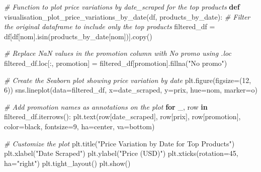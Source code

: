 \documentclass[
]{article}
\newenvironment{Shaded}{}{}
\newcommand{\CommentTok}[1]{\textcolor[rgb]{0.38,0.63,0.69}{\textit{#1}}}
\newcommand{\ControlFlowTok}[1]{\textcolor[rgb]{0.00,0.44,0.13}{\textbf{#1}}}
\newcommand{\DecValTok}[1]{\textcolor[rgb]{0.25,0.63,0.44}{#1}}
\newcommand{\KeywordTok}[1]{\textcolor[rgb]{0.00,0.44,0.13}{\textbf{#1}}}
\newcommand{\NormalTok}[1]{#1}
\newcommand{\OperatorTok}[1]{\textcolor[rgb]{0.40,0.40,0.40}{#1}}
\newcommand{\StringTok}[1]{\textcolor[rgb]{0.25,0.44,0.63}{#1}}
\begin{document}
\hypertarget{546ba214-b06e-4b97-a1c0-a95e80376019}{}
\begin{Shaded}
\begin{Highlighting}[]
\CommentTok{\# Function to plot price variations by \textquotesingle{}date\_scraped\textquotesingle{} for the top products}
\KeywordTok{def}\NormalTok{ visualisation\_plot\_price\_variations\_by\_date(df, products\_by\_date):}
    \CommentTok{\# Filter the original dataframe to include only the top products}
\NormalTok{    filtered\_df }\OperatorTok{=}\NormalTok{ df[df[}\StringTok{\textquotesingle{}nom\textquotesingle{}}\NormalTok{].isin(products\_by\_date[}\StringTok{\textquotesingle{}nom\textquotesingle{}}\NormalTok{])].copy()}

    \CommentTok{\# Replace NaN values in the \textquotesingle{}promotion\textquotesingle{} column with \textquotesingle{}No promo\textquotesingle{} using .loc}
\NormalTok{    filtered\_df.loc[:, }\StringTok{\textquotesingle{}promotion\textquotesingle{}}\NormalTok{] }\OperatorTok{=}\NormalTok{ filtered\_df[}\StringTok{\textquotesingle{}promotion\textquotesingle{}}\NormalTok{].fillna(}\StringTok{"No promo"}\NormalTok{)}

    \CommentTok{\# Create the Seaborn plot showing price variation by date}
\NormalTok{    plt.figure(figsize}\OperatorTok{=}\NormalTok{(}\DecValTok{12}\NormalTok{, }\DecValTok{6}\NormalTok{))}
\NormalTok{    sns.lineplot(data}\OperatorTok{=}\NormalTok{filtered\_df, x}\OperatorTok{=}\StringTok{\textquotesingle{}date\_scraped\textquotesingle{}}\NormalTok{, y}\OperatorTok{=}\StringTok{\textquotesingle{}prix\textquotesingle{}}\NormalTok{, hue}\OperatorTok{=}\StringTok{\textquotesingle{}nom\textquotesingle{}}\NormalTok{, marker}\OperatorTok{=}\StringTok{\textquotesingle{}o\textquotesingle{}}\NormalTok{)}

    \CommentTok{\# Add promotion names as annotations on the plot}
    \ControlFlowTok{for}\NormalTok{ \_, row }\KeywordTok{in}\NormalTok{ filtered\_df.iterrows():}
\NormalTok{        plt.text(row[}\StringTok{\textquotesingle{}date\_scraped\textquotesingle{}}\NormalTok{], row[}\StringTok{\textquotesingle{}prix\textquotesingle{}}\NormalTok{], row[}\StringTok{\textquotesingle{}promotion\textquotesingle{}}\NormalTok{], }
\NormalTok{                 color}\OperatorTok{=}\StringTok{\textquotesingle{}black\textquotesingle{}}\NormalTok{, fontsize}\OperatorTok{=}\DecValTok{9}\NormalTok{, ha}\OperatorTok{=}\StringTok{\textquotesingle{}center\textquotesingle{}}\NormalTok{, va}\OperatorTok{=}\StringTok{\textquotesingle{}bottom\textquotesingle{}}\NormalTok{)}

    \CommentTok{\# Customize the plot}
\NormalTok{    plt.title(}\StringTok{"Price Variation by Date for Top Products"}\NormalTok{)}
\NormalTok{    plt.xlabel(}\StringTok{"Date Scraped"}\NormalTok{)}
\NormalTok{    plt.ylabel(}\StringTok{"Price (USD)"}\NormalTok{)}
\NormalTok{    plt.xticks(rotation}\OperatorTok{=}\DecValTok{45}\NormalTok{, ha}\OperatorTok{=}\StringTok{"right"}\NormalTok{)}
\NormalTok{    plt.tight\_layout()}
\NormalTok{    plt.show()}
\end{Highlighting}
\end{Shaded}
\end{document}

